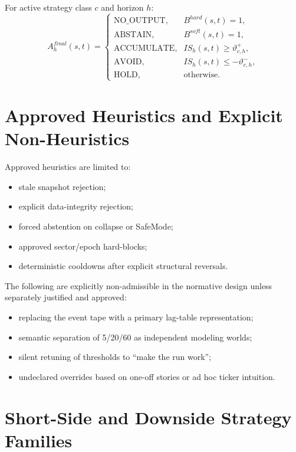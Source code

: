 For active strategy class $c$ and horizon $h$:
\[
A_h^{final}(s,t)=
\begin{cases}
\text{NO\_OUTPUT}, & B^{hard}(s,t)=1,\\
\text{ABSTAIN}, & B^{soft}(s,t)=1,\\
\text{ACCUMULATE}, & IS_h(s,t)\ge \vartheta_{c,h}^{+},\\
\text{AVOID}, & IS_h(s,t)\le -\vartheta_{c,h}^{-},\\
\text{HOLD}, & \text{otherwise.}
\end{cases}
\]

\section{Approved Heuristics and Explicit Non-Heuristics}

Approved heuristics are limited to:
\begin{itemize}
\item stale snapshot rejection;
\item explicit data-integrity rejection;
\item forced abstention on collapse or SafeMode;
\item approved sector/epoch hard-blocks;
\item deterministic cooldowns after explicit structural reversals.
\end{itemize}

The following are explicitly non-admissible in the normative design unless separately justified and approved:
\begin{itemize}
\item replacing the event tape with a primary lag-table representation;
\item semantic separation of 5/20/60 as independent modeling worlds;
\item silent retuning of thresholds to ``make the run work'';
\item undeclared overrides based on one-off stories or ad hoc ticker intuition.
\end{itemize}



\section{Short-Side and Downside Strategy Families}

